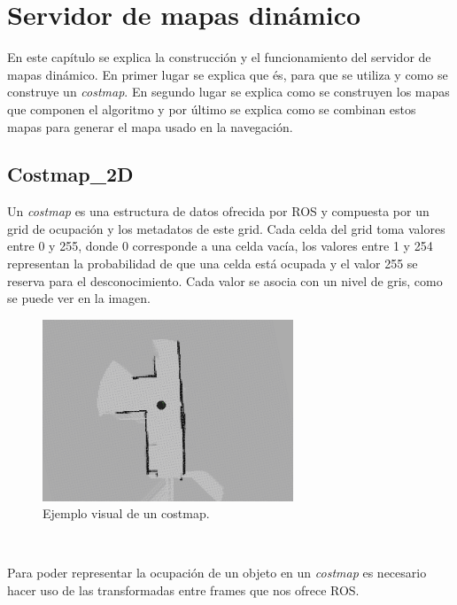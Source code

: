 \chapter{Servidor de mapas dinámico}
\label{cap:sevidordemapasdinamico}


En este capítulo se explica la construcción y el funcionamiento del servidor de mapas dinámico. En primer lugar se explica que és, para que se utiliza y como se construye un \textit{costmap}. En segundo lugar se explica como se construyen los mapas que componen el algoritmo y por último se explica como se combinan estos mapas para generar el mapa usado en la navegación.

\section{Costmap\_2D}
\label{sec:costmap2d}
Un \textit{costmap} es una estructura de datos ofrecida por ROS y compuesta por un grid de ocupación y los metadatos de este grid. Cada celda del grid toma valores entre 0 y 255, donde 0 corresponde a una celda vacía, los valores entre 1 y 254 representan la probabilidad de que una celda está ocupada y el valor 255 se reserva para el desconocimiento. Cada valor se asocia con un nivel de gris, como se puede ver en la imagen.
\begin{figure} [hbtp]
  \begin{center}
    \includegraphics[width=7.5cm]{img/cap4/costmap-ejemplo}
  \end{center}
  \caption{Ejemplo visual de un costmap.}
  \label{fig:costmap-ejemplo}
\end{figure}\

Para poder representar la ocupación de un objeto en un \textit{costmap} es necesario hacer uso de las transformadas entre frames que nos ofrece ROS.

